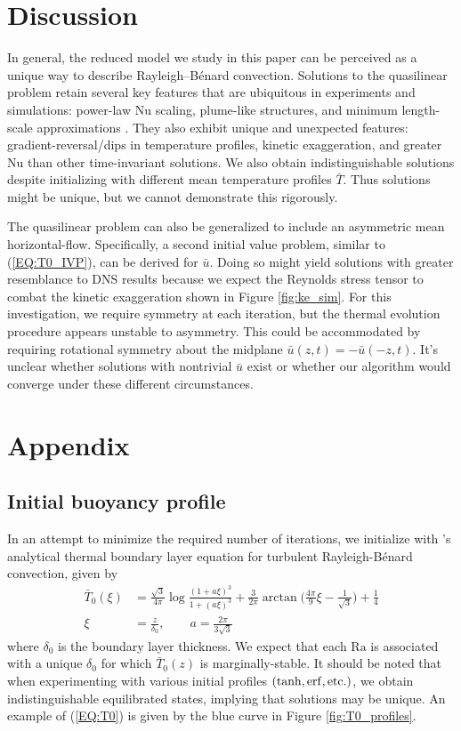 \documentclass[reprint,amsmath,amssymb,aps]{revtex4-1}
\newcommand\Ra{\mathrm{Ra}}
\newcommand\Nu{\mathrm{Nu}}
\begin{document}
\section{Discussion}\label{sec:Discussion}
In general, the reduced model we study in this paper can be perceived as a unique way to describe Rayleigh–Bénard convection. Solutions to the quasilinear problem retain several key features that are ubiquitous in experiments and simulations: power-law $\Nu$ scaling, plume-like structures, and minimum length-scale approximations \cite{Malkus}. They also exhibit unique and unexpected features: gradient-reversal/dips in temperature profiles, kinetic exaggeration, and greater $\Nu$ than other time-invariant solutions. We also obtain indistinguishable solutions despite initializing with different mean temperature profiles $\bar{T}$. Thus solutions might be unique, but we cannot demonstrate this rigorously.
\par The quasilinear problem can also be generalized to include an asymmetric mean horizontal-flow. Specifically, a second initial value problem, similar to (\ref{EQ:T0_IVP}), can be derived for $\bar{u}$. Doing so might yield solutions with greater resemblance to DNS results because we expect the Reynolds stress tensor to combat the kinetic exaggeration shown in Figure \ref{fig:ke_sim}. For this investigation, we require symmetry at each iteration, but the thermal evolution procedure appears unstable to asymmetry. This could be accommodated by requiring rotational symmetry about the midplane $\bar{u}(z, t) = -\bar{u}(-z, t)$. It's unclear whether solutions with nontrivial $\bar{u}$ exist or whether our algorithm would converge under these different circumstances.

\section*{Appendix}
\subsection{Initial buoyancy profile} \label{sec:initial_profile}
In an attempt to minimize the required number of iterations, we initialize with \cite{Shishkina}'s analytical thermal boundary layer equation for turbulent Rayleigh-B\'enard convection, given by 
\begin{align}
    \bar{T}_0(\xi) &= \frac{\sqrt{3}}{4\pi} \log \frac{(1 + a\xi)^3}{1 + (a\xi)^3} + \frac{3}{2\pi} \arctan \Big( \frac{4\pi}{9}\xi - \frac{1}{\sqrt{3}} \Big) + \frac{1}{4} \nonumber \\
    \xi &= \frac{z}{\delta_0}, \qquad a = \frac{2\pi}{3\sqrt{3}}\label{EQ:T0}
\end{align}
where $\delta_0$ is the boundary layer thickness. We expect that each $\Ra$ is associated with a unique $\delta_0$ for which $\bar{T}_0(z)$ is marginally-stable. It should be noted that when experimenting with various initial profiles $(\tanh, \rm{erf}, \rm{etc.})$, we obtain indistinguishable equilibrated states, implying that solutions may be unique. An example of (\ref{EQ:T0}) is given by the blue curve in Figure \ref{fig:T0_profiles}.
\end{document}
